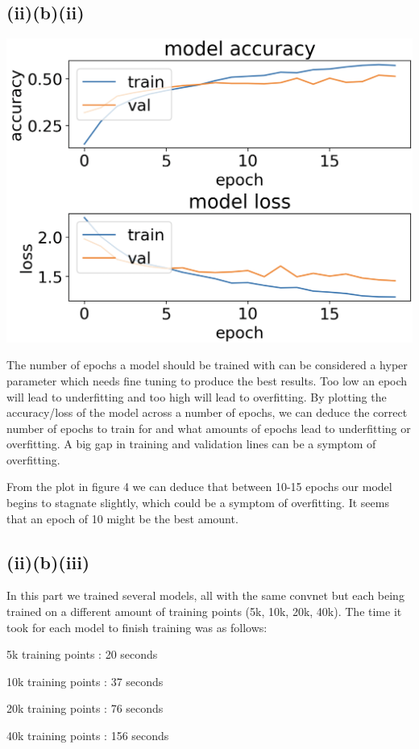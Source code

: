 \documentclass{article}
\begin{document}
\subsection{(ii)(b)(ii)}
\begin{center}
\includegraphics[width=.8\linewidth]{plot.png}
\end{center}

The number of epochs a model should be trained with can be considered a hyper parameter which needs fine tuning to produce the best results. Too low an epoch will lead to underfitting and too high will lead to overfitting. By plotting the accuracy/loss of the model across a number of epochs, we can deduce the correct number of epochs to train for and what amounts of epochs lead to underfitting or overfitting. A big gap in training and validation lines can be a symptom of overfitting.

From the plot in figure 4 we can deduce that between 10-15 epochs our model begins to stagnate slightly, which could be a symptom of overfitting. It seems that an epoch of 10 might be the best amount.

\subsection{(ii)(b)(iii)}
In this part we trained several models, all with the same convnet but each being trained on a different amount of training points (5k, 10k, 20k, 40k). The time it took for each model to finish training was as follows:
\begin{center}
5k training points : 20 seconds

10k training points : 37 seconds

20k training points : 76 seconds

40k training points : 156 seconds
\end{center}
\end{document}

